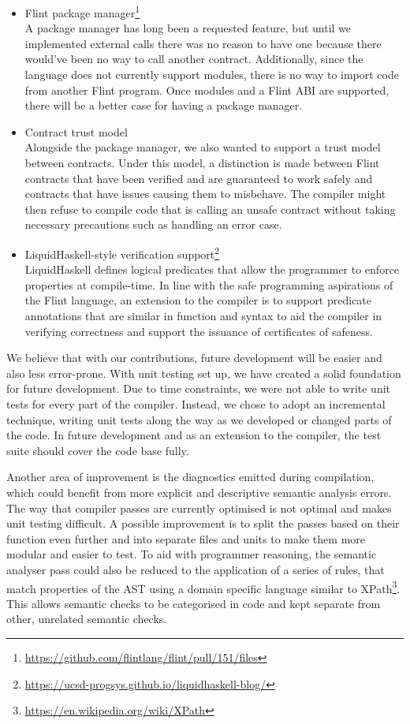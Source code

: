 \begin{itemize}
	\item Flint package manager\footnote{\url{https://github.com/flintlang/flint/pull/151/files}}\\
A package manager has long been a requested feature, but until we implemented external calls there was no reason to have one because there would've been no way to call another contract. Additionally, since the language does not currently support modules, there is no way to import code from another Flint program. Once modules and a Flint ABI are supported, there will be a better case for having a package manager.
	\item Contract trust model\\
Alongside the package manager, we also wanted to support a trust model between contracts. Under this model, a distinction is made between Flint contracts that have been verified and are guaranteed to work safely and contracts that have issues causing them to misbehave. The compiler might then refuse to compile code that is calling an unsafe contract without taking necessary precautions such as handling an error case.
	\item LiquidHaskell-style verification support\footnote{\url{https://ucsd-progsys.github.io/liquidhaskell-blog/}}\\
LiquidHaskell defines logical predicates that allow the programmer to enforce properties at compile-time. In line with the safe programming aspirations of the Flint language, an extension to the compiler is to support predicate annotations that are similar in function and syntax to aid the compiler in verifying correctness and support the issuance of certificates of safeness.
\end{itemize}

We believe that with our contributions, future development will be easier and also less error-prone. With unit testing set up, we have created a solid foundation for future development. Due to time constraints, we were not able to write unit tests for every part of the compiler. Instead, we chose to adopt an incremental technique, writing unit tests along the way as we developed or changed parts of the code. In future development and as an extension to the compiler, the test suite should cover the code base fully.

Another area of improvement is the diagnostics emitted during compilation, which could benefit from more explicit and descriptive semantic analysis errors. The way that compiler passes are currently optimised is not optimal and makes unit testing difficult. A possible improvement is to split the passes based on their function even further and into separate files and units to make them more modular and easier to test. To aid with programmer reasoning, the semantic analyser pass could also be reduced to the application of a series of rules, that match properties of the AST using a domain specific language similar to XPath\footnote{\url{https://en.wikipedia.org/wiki/XPath}}. This allows semantic checks to be categorised in code and kept separate from other, unrelated semantic checks.

